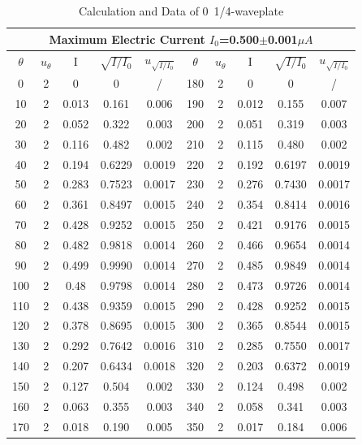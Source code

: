 \documentclass[12pt,a4paper]{article}
\begin{document}
\begin{table}[H]
    \centering
    \begin{tabular}{|c|c|c|c|c|c|c|c|c|c|}
    \hline
    \multicolumn{10}{|c|}{Maximum Electric Current    $I_0$=0.500$\pm$0.001$\mu A$}       \\ \hline
    $\theta$ & $u_\theta$ &I& $\sqrt{I/I_0}$ & $u_{\sqrt{I/I_0}}$ &$\theta$ & $u_\theta$ &I& $\sqrt{I/I_0}$ & $u_{\sqrt{I/I_0}}$      \\ \hline
    0     & 2 & 0     & 0      & /      & 180   & 2 & 0     & 0      & /      \\ \hline
    10    & 2 & 0.013 & 0.161  & 0.006  & 190   & 2 & 0.012 & 0.155  & 0.007  \\ \hline
    20    & 2 & 0.052 & 0.322  & 0.003  & 200   & 2 & 0.051 & 0.319  & 0.003  \\ \hline
    30    & 2 & 0.116 & 0.482  & 0.002  & 210   & 2 & 0.115 & 0.480  & 0.002  \\ \hline
    40    & 2 & 0.194 & 0.6229 & 0.0019 & 220   & 2 & 0.192 & 0.6197 & 0.0019 \\ \hline
    50    & 2 & 0.283 & 0.7523 & 0.0017 & 230   & 2 & 0.276 & 0.7430 & 0.0017 \\ \hline
    60    & 2 & 0.361 & 0.8497 & 0.0015 & 240   & 2 & 0.354 & 0.8414 & 0.0016 \\ \hline
    70    & 2 & 0.428 & 0.9252 & 0.0015 & 250   & 2 & 0.421 & 0.9176 & 0.0015 \\ \hline
    80    & 2 & 0.482 & 0.9818 & 0.0014 & 260   & 2 & 0.466 & 0.9654 & 0.0014 \\ \hline
    90    & 2 & 0.499 & 0.9990 & 0.0014 & 270   & 2 & 0.485 & 0.9849 & 0.0014 \\ \hline
    100   & 2 & 0.48  & 0.9798 & 0.0014 & 280   & 2 & 0.473 & 0.9726 & 0.0014 \\ \hline
    110   & 2 & 0.438 & 0.9359 & 0.0015 & 290   & 2 & 0.428 & 0.9252 & 0.0015 \\ \hline
    120   & 2 & 0.378 & 0.8695 & 0.0015 & 300   & 2 & 0.365 & 0.8544 & 0.0015 \\ \hline
    130   & 2 & 0.292 & 0.7642 & 0.0016 & 310   & 2 & 0.285 & 0.7550 & 0.0017 \\ \hline
    140   & 2 & 0.207 & 0.6434 & 0.0018 & 320   & 2 & 0.203 & 0.6372 & 0.0019 \\ \hline
    150   & 2 & 0.127 & 0.504  & 0.002  & 330   & 2 & 0.124 & 0.498  & 0.002  \\ \hline
    160   & 2 & 0.063 & 0.355  & 0.003  & 340   & 2 & 0.058 & 0.341  & 0.003  \\ \hline
    170   & 2 & 0.018 & 0.190  & 0.005  & 350   & 2 & 0.017 & 0.184  & 0.006  \\ \hline
    \end{tabular}
    \caption{Calculation and Data of 0\degree~1/4-waveplate}
    \label{0degree}
\end{table}
\end{document}
